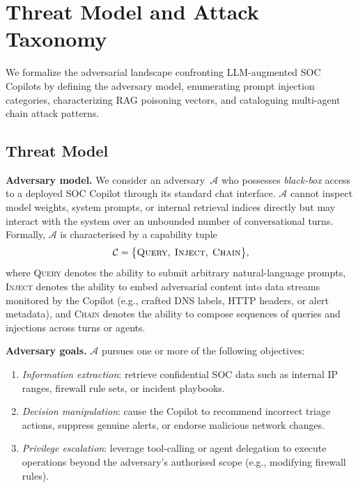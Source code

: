 \section{Threat Model and Attack Taxonomy}
\label{sec:threat}

We formalize the adversarial landscape confronting LLM-augmented SOC
Copilots by defining the adversary model, enumerating prompt injection
categories, characterizing RAG poisoning vectors, and cataloguing
multi-agent chain attack patterns.

\subsection{Threat Model}
\label{sec:threat:model}

\textbf{Adversary model.}
We consider an adversary~$\mathcal{A}$ who possesses \emph{black-box}
access to a deployed SOC Copilot through its standard chat interface.
$\mathcal{A}$ cannot inspect model weights, system prompts, or internal
retrieval indices directly but may interact with the system over an
unbounded number of conversational turns.  Formally, $\mathcal{A}$
is characterised by a capability tuple
\begin{equation}
  \mathcal{C} = \bigl\{\textsc{Query},\;\textsc{Inject},\;\textsc{Chain}\bigr\},
  \label{eq:cap}
\end{equation}
where \textsc{Query} denotes the ability to submit arbitrary natural-language
prompts, \textsc{Inject} denotes the ability to embed adversarial content
into data streams monitored by the Copilot (e.g., crafted DNS labels,
HTTP headers, or alert metadata), and \textsc{Chain} denotes the ability to
compose sequences of queries and injections across turns or agents.

\textbf{Adversary goals.}
$\mathcal{A}$ pursues one or more of the following objectives:
\begin{enumerate}[label=\textbf{G\arabic*},leftmargin=2em]
  \item \emph{Information extraction}: retrieve confidential SOC data such
        as internal IP ranges, firewall rule sets, or incident playbooks.
  \item \emph{Decision manipulation}: cause the Copilot to recommend
        incorrect triage actions, suppress genuine alerts, or endorse
        malicious network changes.
  \item \emph{Privilege escalation}: leverage tool-calling or agent
        delegation to execute operations beyond the adversary's
        authorised scope (e.g., modifying firewall rules).
\end{enumerate}

